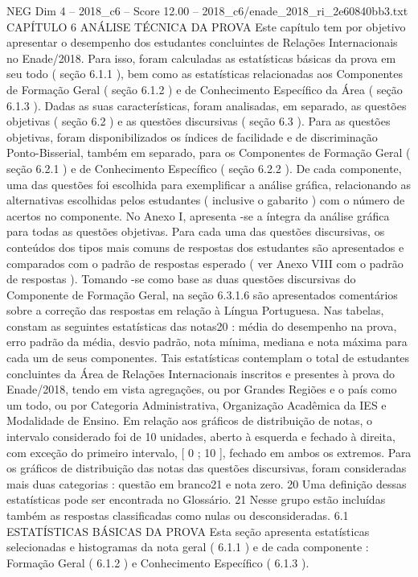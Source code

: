 \begin{textsample}{NEG Dim 4 – 2018\_c6 – Score 12.00 – 2018\_c6/enade\_2018\_ri\_2e60840bb3.txt}  \label{ex:f4_neg_340}
CAPÍTULO 6 ANÁLISE TÉCNICA DA PROVA Este capítulo tem por objetivo apresentar o desempenho dos estudantes concluintes de Relações Internacionais no Enade/2018.
Para isso, foram calculadas as estatísticas básicas da prova em seu todo ( seção 6.1.1 ), bem como as estatísticas relacionadas aos Componentes de Formação Geral ( seção 6.1.2 ) e de Conhecimento Específico da Área ( seção 6.1.3 ).
Dadas as suas características, foram analisadas, em separado, as questões objetivas ( seção 6.2 ) e as questões discursivas ( seção 6.3 ).
Para as questões objetivas, foram disponibilizados os índices de facilidade e de discriminação Ponto-Bisserial, também em separado, para os Componentes de Formação Geral ( seção 6.2.1 ) e de Conhecimento Específico ( seção 6.2.2 ).
De cada componente, uma das questões foi escolhida para exemplificar a análise gráfica, relacionando as alternativas escolhidas pelos estudantes ( inclusive o gabarito ) com o número de acertos no componente.
No Anexo I, apresenta -se a íntegra da análise gráfica para todas as questões objetivas.
Para cada uma das questões discursivas, os conteúdos dos tipos mais comuns de respostas dos estudantes são apresentados e comparados com o padrão de respostas esperado ( ver Anexo VIII com o padrão de respostas ).
Tomando -se como base as duas questões discursivas do Componente de Formação Geral, na seção 6.3.1.6 são apresentados comentários sobre a correção das respostas em relação à Língua Portuguesa.
Nas tabelas, constam as seguintes estatísticas das notas20 : média do desempenho na prova, erro padrão da média, desvio padrão, nota mínima, mediana e nota máxima para cada um de seus componentes.
Tais estatísticas contemplam o total de estudantes concluintes da Área de Relações Internacionais inscritos e presentes à prova do Enade/2018, tendo em vista agregações, ou por Grandes Regiões e o país como um todo, ou por Categoria Administrativa, Organização Acadêmica da IES e Modalidade de Ensino.
Em relação aos gráficos de distribuição de notas, o intervalo considerado foi de 10 unidades, aberto à esquerda e fechado à direita, com exceção do primeiro intervalo, [ 0 ; 10 ], fechado em ambos os extremos.
Para os gráficos de distribuição das notas das questões discursivas, foram consideradas mais duas categorias : questão em branco21 e nota zero. 20 Uma definição dessas estatísticas pode ser encontrada no Glossário. 21 Nesse grupo estão incluídas também as respostas classificadas como nulas ou desconsideradas. 6.1 ESTATÍSTICAS BÁSICAS DA PROVA Esta seção apresenta estatísticas selecionadas e histogramas da nota geral ( 6.1.1 ) e de cada componente : Formação Geral ( 6.1.2 ) e Conhecimento Específico ( 6.1.3 ).

\end{textsample}
